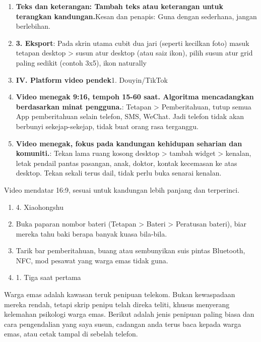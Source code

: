 \begin{enumerate}
  \item \textbf{Teks dan keterangan: Tambah teks atau keterangan untuk terangkan kandungan.}Kesan dan penapis: Guna dengan sederhana, jangan berlebihan.
  \item \textbf{3. Eksport}: Pada skrin utama cubit dua jari (seperti kecilkan foto) masuk tetapan desktop > susun atur desktop (atau saiz ikon), pilih susun atur grid paling sedikit (contoh 3x5), ikon naturally
  \item \textbf{IV. Platform video pendek}1. Douyin/TikTok
  \item \textbf{Video menegak 9:16, tempoh 15-60 saat. Algoritma mencadangkan berdasarkan minat pengguna.}: Tetapan > Pemberitahuan, tutup semua App pemberitahuan selain telefon, SMS, WeChat. Jadi telefon tidak akan berbunyi sekejap-sekejap, tidak buat orang rasa terganggu.
  \item \textbf{Video menegak, fokus pada kandungan kehidupan seharian dan komuniti.}: Tekan lama ruang kosong desktop > tambah widget > kenalan, letak pendail pantas pasangan, anak, doktor, kontak kecemasan ke atas desktop. Tekan sekali terus dail, tidak perlu buka senarai kenalan.
\end{enumerate}

\begin{tcbpractice}{Video mendatar 16:9, sesuai untuk kandungan lebih panjang dan terperinci.}
\begin{enumerate}
  \item 4. Xiaohongshu
  \item Buka paparan nombor bateri (Tetapan > Bateri > Peratusan bateri), biar mereka tahu baki berapa banyak kuasa bila-bila.
  \item Tarik bar pemberitahuan, buang atau sembunyikan suis pintas Bluetooth, NFC, mod pesawat yang warga emas tidak guna.
  \item 1. Tiga saat pertama
\end{enumerate}

\end{tcbpractice}


Warga emas adalah kawasan teruk penipuan telekom. Bukan kewaspadaan mereka rendah, tetapi skrip penipu telah direka teliti, khusus menyerang kelemahan psikologi warga emas. Berikut adalah jenis penipuan paling biasa dan cara pengendalian yang saya susun, cadangan anda terus baca kepada warga emas, atau cetak tampal di sebelah telefon.

